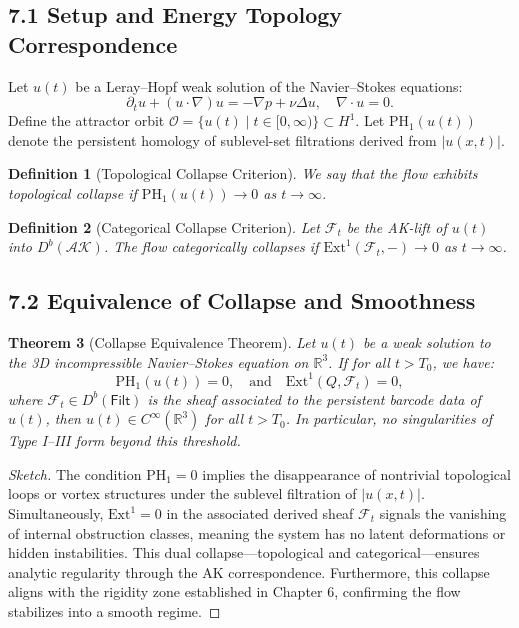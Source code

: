 \documentclass[11pt]{article}
\newtheorem{theorem}{Theorem}[section]
\newtheorem{definition}[theorem]{Definition}
\begin{document}
\subsection{7.1 Setup and Energy Topology Correspondence}

Let $u(t)$ be a Leray–Hopf weak solution of the Navier--Stokes equations:
\[
\partial_t u + (u \cdot \nabla) u = -\nabla p + \nu \Delta u, \quad \nabla \cdot u = 0.
\]
Define the attractor orbit $\mathcal{O} = \{ u(t) \mid t \in [0, \infty) \} \subset H^1$. Let $\mathrm{PH}_1(u(t))$ denote the persistent homology of sublevel-set filtrations derived from $|u(x,t)|$.

\begin{definition}[Topological Collapse Criterion]
We say that the flow exhibits topological collapse if $\mathrm{PH}_1(u(t)) \to 0$ as $t \to \infty$.
\end{definition}

\begin{definition}[Categorical Collapse Criterion]
Let $\mathcal{F}_t$ be the AK-lift of $u(t)$ into $D^b(\mathcal{AK})$. The flow categorically collapses if $\mathrm{Ext}^1(\mathcal{F}_t, -) \to 0$ as $t \to \infty$.
\end{definition}

\subsection{7.2 Equivalence of Collapse and Smoothness}

\begin{theorem}[Collapse Equivalence Theorem]
Let \( u(t) \) be a weak solution to the 3D incompressible Navier–Stokes equation on \( \mathbb{R}^3 \).  
If for all \( t > T_0 \), we have:
\[
\mathrm{PH}_1(u(t)) = 0, \quad \text{and} \quad \mathrm{Ext}^1(Q, \mathcal{F}_t) = 0,
\]
where \( \mathcal{F}_t \in D^b(\mathsf{Filt}) \) is the sheaf associated to the persistent barcode data of \( u(t) \),  
then \( u(t) \in C^\infty(\mathbb{R}^3) \) for all \( t > T_0 \).  
In particular, no singularities of Type I–III form beyond this threshold.
\end{theorem}

\begin{proof}[Sketch]
The condition $\mathrm{PH}_1 = 0$ implies the disappearance of nontrivial topological loops or vortex structures under the sublevel filtration of $|u(x,t)|$.  
Simultaneously, $\mathrm{Ext}^1 = 0$ in the associated derived sheaf $\mathcal{F}_t$ signals the vanishing of internal obstruction classes, meaning the system has no latent deformations or hidden instabilities.  
This dual collapse—topological and categorical—ensures analytic regularity through the AK correspondence.  
Furthermore, this collapse aligns with the rigidity zone established in Chapter 6, confirming the flow stabilizes into a smooth regime.
\end{proof}
\end{document}
